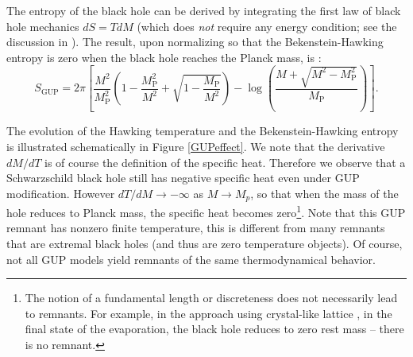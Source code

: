 \documentclass[12pt]{article}
\newcommand{\2}{$^2$}
\newcommand{\3}{$^3$}
\newcommand{\4}{$_4$}
\newcommand{\5}{$_5$}
\begin{document}
The entropy of the black hole can be derived by integrating the first law of black hole mechanics $dS= T dM$ (which does \emph{not} require any energy condition; see the discussion in \cite{primer}). The result, upon normalizing so that the Bekenstein-Hawking entropy is zero when the black hole reaches the Planck mass, is \cite{pisin}:
\begin{equation}
S_{\text{GUP}} = 2\pi \left[\frac{M^2}{M_\text{P}^2}\left(1-\frac{M_\text{P}^2}{M^2}+\sqrt{1-\frac{M_\text{P}}{M^2}}\right)-\log\left(\frac{M+\sqrt{M^2-M_\text{P}^2}}{M_\text{P}}\right)\right].
\end{equation}

The evolution of the Hawking temperature and the Bekenstein-Hawking entropy is illustrated schematically in Figure \ref{GUPeffect}. We note that the derivative $dM/dT$ is of course the definition of the specific heat. Therefore we observe that a Schwarzschild black hole still has negative specific heat even under GUP modification. However $dT/dM \to -\infty$ as $M \to M_p$, so that when the mass of the hole reduces to Planck mass, the specific heat becomes zero\footnote{The notion of a fundamental length or discreteness does not necessarily lead to remnants. For example, in the approach using crystal-like lattice \cite{JKS}, in the final state of the evaporation, the black hole reduces to zero rest mass -- there is no remnant.}.  Note that this GUP remnant has nonzero finite temperature, this is different from many remnants that are extremal black holes (and thus are zero temperature objects). Of course, not all GUP models yield remnants of the same thermodynamical behavior.
\end{document}
